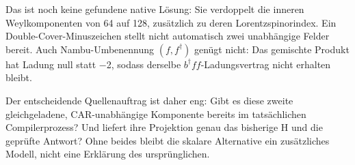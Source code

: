 Das ist noch keine gefundene native Lösung: Sie verdoppelt die inneren
Weylkomponenten von 64 auf 128, zusätzlich zu deren Lorentzspinorindex.
Ein Double-Cover-Minuszeichen stellt nicht automatisch zwei unabhängige
Felder bereit. Auch Nambu-Umbenennung \((f,f^\dagger)\) genügt nicht:
Das gemischte Produkt hat Ladung null statt −2, sodass derselbe
\(b^\dagger ff\)-Ladungsvertrag nicht erhalten bleibt.

Der entscheidende Quellenauftrag ist daher eng: Gibt es diese zweite
gleichgeladene, CAR-unabhängige Komponente bereits im tatsächlichen
Compilerprozess? Und liefert ihre Projektion genau das bisherige H und
die geprüfte Antwort? Ohne beides bleibt die skalare Alternative ein
zusätzliches Modell, nicht eine Erklärung des ursprünglichen.

